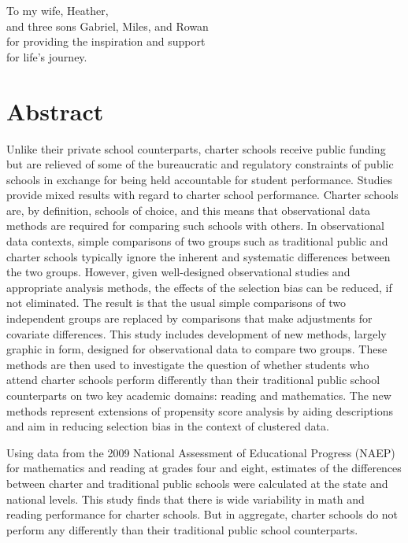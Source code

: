 \documentclass[letterpaper,12p,twoside]{article} %
\begin{document}

\setcounter{page}{3}

{}
\vspace*{2.5 in}
\begin{center}
\noindent To my wife, Heather,\\and three sons Gabriel, Miles, and Rowan\\for providing the inspiration and support\\for life's journey.
\end{center}
\vspace*{\fill}


\cleardoublepage
\section{Abstract}

Unlike their private school counterparts, charter schools receive public funding but are relieved of some of the bureaucratic and regulatory constraints of public schools in exchange for being held accountable for student performance. Studies provide mixed results with regard to charter school performance. Charter schools are, by definition, schools of choice, and this means that observational data methods are required for comparing such schools with others. In observational data contexts, simple comparisons of two groups such as traditional public and charter schools typically ignore the inherent and systematic differences between the two groups. %
However, given well-designed observational studies and appropriate analysis methods, the effects of the selection bias can be reduced, if not eliminated. The result is that the usual simple comparisons of two independent groups are replaced by comparisons that make adjustments for covariate differences. This study includes development of new methods, largely graphic in form, designed for observational data to compare two groups. These methods are then used to investigate the question of whether students who attend charter schools perform differently than their traditional public school counterparts on two key academic domains: reading and mathematics. The new methods represent extensions of propensity score analysis \cite{RosenbaumRubin1983} by aiding descriptions and aim in reducing selection bias in the context of clustered data.

Using data from the 2009 National Assessment of Educational Progress (NAEP) for mathematics and reading at grades four and eight, estimates of the differences between charter and traditional public schools were calculated at the state and national levels. This study finds that there is wide variability in math and reading performance for charter schools. But in aggregate, charter schools do not perform any differently than their traditional public school counterparts. 
\end{document}
